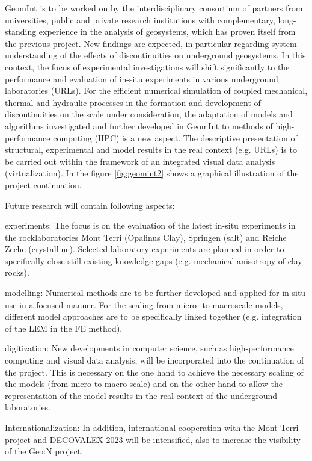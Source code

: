 GeomInt is to be worked on by the interdisciplinary consortium of partners from universities, public and private research institutions with complementary, long-standing experience in the analysis of geosystems, which has proven itself from the previous project. New findings are expected, in particular regarding system understanding of the effects of discontinuities on underground geosystems. In this context, the focus of experimental investigations will shift significantly to the performance and evaluation of in-situ experiments in various underground laboratories (URLs). For the efficient numerical simulation of coupled mechanical, thermal and hydraulic processes in the formation and development of discontinuities on the scale under consideration, the adaptation of models and algorithms investigated and further developed in GeomInt to methods of high-performance computing (HPC) is a new aspect. The descriptive presentation of structural, experimental and model results in the real context (e.g. URLs) is to be carried out within the framework of an integrated visual data analysis (virtualization).
In the figure \ref{fig:geomint2} shows a graphical illustration of the project continuation.

Future research will contain following aspects:
\begin{list}{--}{\leftmargin=1em \itemindent=0em \itemsep=-0.5em}
\item experiments: The focus is on the evaluation of the latest in-situ experiments in the rock\-laboratories Mont Terri (Opalinus Clay), Springen (salt) and Reiche Zeche (crystalline). Selected laboratory experiments are planned in order to specifically close still existing knowledge gaps (e.g. mechanical anisotropy of clay rocks).
\item modelling: Numerical methods are to be further developed and applied for in-situ use in a focused manner. For the scaling from micro- to macroscale models, different model approaches are to be specifically linked together (e.g. integration of the LEM in the FE method).
\item digitization: New developments in computer science, such as high-performance computing and visual data analysis, will be incorporated into the continuation of the project. This is necessary on the one hand to achieve the necessary scaling of the models (from micro to macro scale) and on the other hand to allow the representation of the model results in the real context of the underground laboratories.
\item Internationalization: In addition, international cooperation with the Mont Terri project and DECOVALEX 2023 will be intensified, also to increase the visibility of the Geo:N project.
\end{list}

